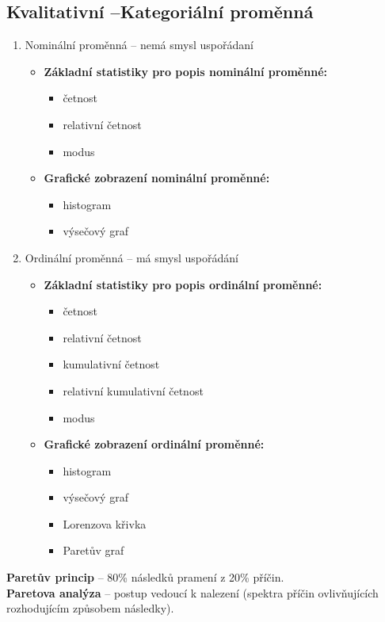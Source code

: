  \subsection{Kvalitativní --Kategoriální proměnná}
\begin{enumerate}[label=\alph*)]
	\item Nominální proměnná -- nemá smysl uspořádaní
	\begin{itemize}
		\item \textbf{Základní statistiky pro popis nominální proměnné:}
	 		\begin{itemize}
	 			\item četnost
	 			\item relativní četnost
	 			\item modus
	 		\end{itemize}
	\item \textbf{Grafické zobrazení nominální proměnné:}
			\begin{itemize}
				\item histogram
				\item výsečový graf
			\end{itemize}
	\end{itemize}
	\item Ordinální proměnná -- má smysl uspořádání
	\begin{itemize}
		\item \textbf{Základní statistiky pro popis ordinální proměnné:}
	 		\begin{itemize}
	 			\item četnost
	 			\item relativní četnost
	 			\item kumulativní četnost
	 			\item relativní kumulativní četnost
	 			\item modus
	 		\end{itemize}
		\item \textbf{Grafické zobrazení ordinální proměnné:}
				\begin{itemize}
						\item histogram
						\item výsečový graf
						\item Lorenzova křivka
						\item Paretův graf
				\end{itemize}
	\end{itemize}
\end{enumerate}
\textbf{Paretův princip} – 80\% následků pramení z 20\% příčin.\\
\textbf{Paretova analýza} – postup vedoucí k nalezení  (spektra příčin ovlivňujících rozhodujícím způsobem následky).


